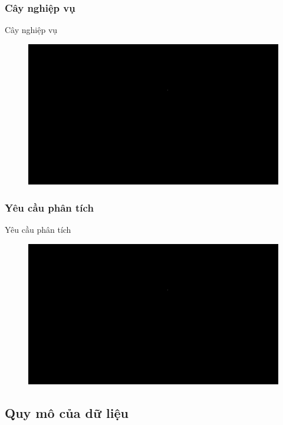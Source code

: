 \documentclass{beamer}
\begin{document}
\subsubsection{Cây nghiệp vụ}
\begin{frame}{Cây nghiệp vụ}
\begin{figure}[H]
\centering
\includegraphics[scale = 0.3]{pictures/black.png}
\end{figure}
\end{frame}
\subsubsection{Yêu cầu phân tích}
\begin{frame}{Yêu cầu phân tích}
\begin{figure}[H]
\centering
\includegraphics[scale = 0.3]{pictures/black.png}
\end{figure}
\end{frame}

\subsection{Quy mô của dữ liệu}
\end{document}
